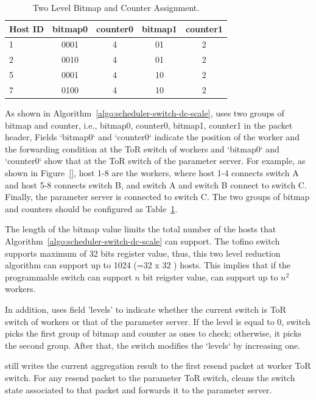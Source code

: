 \begin{table}[h!]
  \begin{center}
    \caption{Two Level Bitmap and Counter Assignment.}
    \label{tab:two-level-bitmaps}
    \begin{tabular}{|l|c|c|c|c|} 
	\hline
		\textbf{Host ID } & \textbf{bitmap0} & \textbf{counter0} & \textbf{bitmap1} & \textbf{counter1}  \\
      \hline
		1 & 0001 & 4 & 01 & 2  \\
      \hline
		2 & 0010 & 4 & 01 & 2  \\
		\hline
		5 & 0001 & 4 & 10 & 2  \\
		\hline 
		7 & 0100 & 4 & 10 & 2  \\
		\hline 
    \end{tabular}
  \end{center}
\end{table}

As shown in Algorithm~\ref{algo:scheduler-switch-dc-scale}, \system uses two groups of bitmap and counter,
i.e., bitmap0, counter0, bitmap1, counter1 in the packet header, 
Fields `bitmap0` and `counter0` indicate the position of the worker and the forwarding condition
at the ToR switch of workers and `bitmap0` and `counter0` show that at the ToR switch of the parameter server.
For example, as shown in Figure~\ref{}, host 1-8 are the workers, where host 1-4 connects switch A and host 5-8 connects switch B, and switch A 
and switch B connect to switch C. Finally, the parameter server is connected to switch C.
The two groups of bitmap and counters should be configured as Table~\ref{tab:two-level-bitmaps}.

The length of the bitmap value limits the total number of the hosts 
that Algorithm~\ref{algo:scheduler-switch-dc-scale} can support.
The tofino switch supports maximum of 32 bits register value, thus, this two level reduction algorithm can support 
up to 1024 (=32 x 32 ) hosts. This implies that if the programmable switch can support $n$ bit reigster value, 
\system can support up to $n^2$ workers.

In addition, \system uses field 'levels' to indicate whether the current switch is ToR switch of workers
or that of the parameter server. 
If the level is equal to 0, switch picks the first group of bitmap and counter as
ones to check; otherwise, it picks the second group. After that, the switch modifies 
the `levels` by increasing one.

\system still writes the current aggregation result to the first resend packet at worker ToR switch. 
For any resend packet to the parameter ToR switch, 
\system cleans the switch state associated to that packet and forwards it to the parameter server. 
